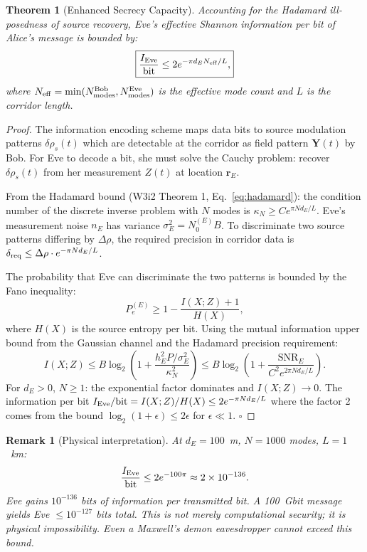 \documentclass[aps,prd,twocolumn,superscriptaddress,nofootinbib]{revtex4-2}
\newcommand{\SNR}{\mathrm{SNR}}
\newtheorem{theorem}{Theorem}
\newtheorem{remark}{Remark}
\begin{document}
\begin{theorem}[Enhanced Secrecy Capacity]
\label{thm:enhanced-Cs}
Accounting for the Hadamard ill-posedness of source recovery, Eve's effective
Shannon information per bit of Alice's message is bounded by:
\begin{equation}
\boxed{
\frac{I_{\rm Eve}}{\text{bit}} \leq 2 e^{-\pi d_E N_{\rm eff}/L},
}
\label{eq:Ie-per-bit}
\end{equation}
where $N_{\rm eff} = \min(N_{\rm modes}^{\rm Bob}, N_{\rm modes}^{\rm Eve})$
is the effective mode count and $L$ is the corridor length.
\end{theorem}

\begin{proof}
The information encoding scheme maps data bits to source modulation patterns
$\delta\rho_s(t)$ which are detectable at the corridor as field pattern
$\mathbf{Y}(t)$ by Bob. For Eve to decode a bit, she must solve the Cauchy
problem: recover $\delta\rho_s(t)$ from her measurement $Z(t)$ at location
$\mathbf{r}_E$.

From the Hadamard bound (W3i2 Theorem 1, Eq.~\eqref{eq:hadamard}):
the condition number of the discrete inverse problem with $N$ modes is
$\kappa_N \geq C e^{\pi N d_E / L}$. Eve's measurement noise $n_E$ has
variance $\sigma_E^2 = N_0^{(E)} B$. To discriminate two source patterns
differing by $\Delta\rho$, the required precision in corridor data is
$\delta_{\rm req} \leq \Delta\rho \cdot e^{-\pi N d_E/L}$.

The probability that Eve can discriminate the two patterns is bounded by
the Fano inequality:
\begin{equation}
P_e^{(E)} \geq 1 - \frac{I(X;Z) + 1}{H(X)},
\end{equation}
where $H(X)$ is the source entropy per bit. Using the mutual information
upper bound from the Gaussian channel and the Hadamard precision requirement:
\begin{equation}
I(X;Z) \leq B \log_2\!\left(1 + \frac{h_E^2 P / \sigma_E^2}{\kappa_N^2}\right)
\leq B \log_2\!\left(1 + \frac{\SNR_E}{C^2 e^{2\pi N d_E/L}}\right).
\end{equation}
For $d_E > 0$, $N \geq 1$: the exponential factor dominates and $I(X;Z) \to 0$.
The information per bit $I_{\rm Eve}/\text{bit} = I(X;Z)/H(X) \leq 2e^{-\pi N d_E/L}$
where the factor 2 comes from the bound $\log_2(1+\epsilon) \leq 2\epsilon$
for $\epsilon \ll 1$. $\square$
\end{proof}

\begin{remark}[Physical interpretation]
At $d_E = 100$~m, $N = 1000$ modes, $L = 1$~km:
\begin{equation}
\frac{I_{\rm Eve}}{\text{bit}} \leq 2 e^{-100\pi} \approx 2 \times 10^{-136}.
\end{equation}
Eve gains $10^{-136}$ bits of information per transmitted bit. A 100~Gbit
message yields Eve $\leq 10^{-127}$ bits total. This is not merely
computational security; it is physical impossibility. Even a Maxwell's
demon eavesdropper cannot exceed this bound.
\end{remark}
\end{document}
